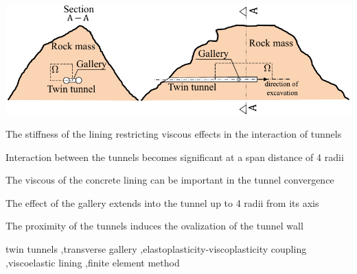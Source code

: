 \documentclass[a4paper,fleqn]{cas-sc}
\begin{document}
\begin{abstract}
\end{abstract}

\begin{graphicalabstract}
\includegraphics[scale=1]{Domain.pdf}
\end{graphicalabstract}

\begin{highlights}
	\item The stiffness of the lining restricting viscous effects in the interaction of tunnels
	\item Interaction between the tunnels becomes significant at a span distance of 4 radii
	\item The viscous of the concrete lining can be important in the tunnel convergence
	\item The effect of the gallery extends into the tunnel up to 4 radii from its axis
	\item The proximity of the tunnels induces the ovalization of the tunnel wall 
\end{highlights}

\begin{keywords}
twin tunnels \sep transverse gallery \sep elastoplasticity-viscoplasticity coupling
\sep viscoelastic lining \sep finite element method
\end{keywords}
\end{document}
